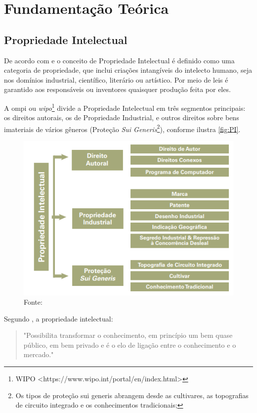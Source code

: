 \chapter{Fundamentação Teórica}
\label{chp:fundamentaçãoTeórica}


\section{Propriedade Intelectual}

De acordo com \citet{WIPO2016} e \citet{howe2013concepts} o conceito de Propriedade Intelectual é definido como uma categoria de propriedade, que inclui criações intangíveis do intelecto humano, seja nos domínios industrial, científico, literário ou artístico. Por meio de leis é garantido aos responsáveis ou inventores quaisquer produção feita por eles.

A \ac{ompi} ou \textit{\ac{wipo}}\footnote{WIPO <https://www.wipo.int/portal/en/index.html> 
} divide a Propriedade Intelectual em três segmentos principais: os  direitos  autorais,  os  de Propriedade  Industrial,  e  outros  direitos  sobre  bens  imateriais  de  vários  gêneros (Proteção \textit{Sui Generis}\footnote{Os tipos de proteção sui generis abrangem desde as cultivares, as topografias de circuito integrado e os conhecimentos tradicionais;}),  conforme  ilustra \autoref{fig:PI}.

\begin{figure}[H]
\centering
\includegraphics[]{images/modalidades}
\caption{Fonte: \citep{jungman2010}}
\label{fig:PI}
\end{figure}

Segundo \citet{buainain2005propriedade}, a propriedade intelectual:%
\begin{quote}
    "Possibilita transformar o conhecimento, em princípio um bem quase público, em bem privado e é o elo de ligação entre o conhecimento e o mercado."
\end{quote}


